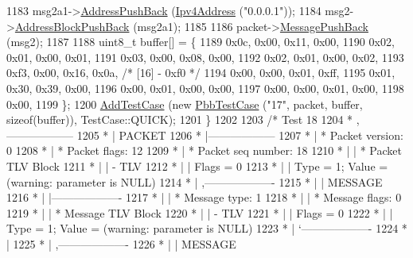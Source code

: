 \begin{DoxyCode}
1183     msg2a1->\hyperlink{classns3_1_1PbbAddressBlock_a7be545a53d69bd426dbebcf752ed8371}{AddressPushBack} (\hyperlink{classns3_1_1Ipv4Address}{Ipv4Address} (\textcolor{stringliteral}{"0.0.0.1"}));
1184     msg2->\hyperlink{classns3_1_1PbbMessage_a5f623bad2fb1adde7da885e1c92d5311}{AddressBlockPushBack} (msg2a1);
1185 
1186     packet->\hyperlink{classns3_1_1PbbPacket_a4a3170001ef758d9c9c4375b8f089826}{MessagePushBack} (msg2);
1187 
1188     uint8\_t buffer[] = \{
1189       0x0c, 0x00, 0x11, 0x00,
1190       0x02, 0x01, 0x00, 0x01,
1191       0x03, 0x00, 0x08, 0x00,
1192       0x02, 0x01, 0x00, 0x02,
1193       0xf3, 0x00, 0x16, 0x0a,   \textcolor{comment}{/* [16] - 0xf0 */}
1194       0x00, 0x00, 0x01, 0xff,
1195       0x01, 0x30, 0x39, 0x00,
1196       0x00, 0x01, 0x00, 0x00,
1197       0x00, 0x00, 0x01, 0x00,
1198       0x00,
1199     \};
1200     \hyperlink{classns3_1_1TestCase_a3718088e3eefd5d6454569d2e0ddd835}{AddTestCase} (\textcolor{keyword}{new} \hyperlink{classPbbTestCase}{PbbTestCase} (\textcolor{stringliteral}{"17"}, packet, buffer, \textcolor{keyword}{sizeof}(buffer)), 
      TestCase::QUICK);
1201   \}
1202 
1203   \textcolor{comment}{/* Test 18}
1204 \textcolor{comment}{         * ,------------------}
1205 \textcolor{comment}{         * |  PACKET}
1206 \textcolor{comment}{         * |------------------}
1207 \textcolor{comment}{         * | * Packet version:    0}
1208 \textcolor{comment}{         * | * Packet flags:  12}
1209 \textcolor{comment}{         * | * Packet seq number: 18}
1210 \textcolor{comment}{         * |    | * Packet TLV Block}
1211 \textcolor{comment}{         * |    |     - TLV}
1212 \textcolor{comment}{         * |    |         Flags = 0}
1213 \textcolor{comment}{         * |    |         Type = 1; Value = (warning: parameter is NULL)}
1214 \textcolor{comment}{         * |    ,-------------------}
1215 \textcolor{comment}{         * |    |  MESSAGE}
1216 \textcolor{comment}{         * |    |-------------------}
1217 \textcolor{comment}{         * |    | * Message type:       1}
1218 \textcolor{comment}{         * |    | * Message flags:  0}
1219 \textcolor{comment}{         * |    | * Message TLV Block}
1220 \textcolor{comment}{         * |    |     - TLV}
1221 \textcolor{comment}{         * |    |         Flags = 0}
1222 \textcolor{comment}{         * |    |         Type = 1; Value = (warning: parameter is NULL)}
1223 \textcolor{comment}{         * |    `-------------------}
1224 \textcolor{comment}{         * |}
1225 \textcolor{comment}{         * |    ,-------------------}
1226 \textcolor{comment}{         * |    |  MESSAGE}

\end{DoxyCode}
